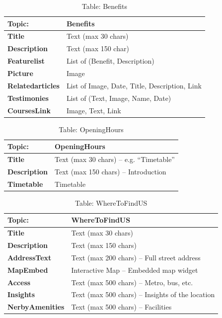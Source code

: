 \begin{table}[H]
\centering
\begin{tabularx}{\textwidth}{|>{\bfseries}l|X|}
\hline
Topic: & \textbf{Benefits} \\
\hline
Title & Text (max 30 chars) \\
\hline
Description & Text (max 150 char) \\
\hline
Featurelist & List of (Benefit, Description) \\
\hline
Picture & Image \\
\hline
Relatedarticles & List of {Image, Date, Title, Description, Link} \\
\hline
Testimonies & List of (Text, Image, Name, Date) \\
\hline
CoursesLink & Image, Text, Link \\
\hline
\end{tabularx}
\caption{Table: Benefits}
\end{table}

\begin{table}[H]
\centering
\begin{tabularx}{\textwidth}{|>{\bfseries}l|X|}
\hline
Topic: & \textbf{OpeningHours} \\
\hline
Title & Text (max 30 chars) – e.g. “Timetable” \\
\hline
Description & Text (max 150 chars) – Introduction \\
\hline
Timetable & Timetable \\
\hline
\end{tabularx}
\caption{Table: OpeningHours}
\end{table}

\begin{table}[H]
\centering
\begin{tabularx}{\textwidth}{|>{\bfseries}l|X|}
\hline
Topic: & \textbf{WhereToFindUS} \\
\hline
Title & Text (max 30 chars) \\
\hline
Description & Text (max 150 chars) \\
\hline
AddressText & Text (max 200 chars) – Full street address \\
\hline
MapEmbed & Interactive Map – Embedded map widget \\
\hline
Access & Text (max 500 chars) – Metro, bus, etc. \\
\hline
Insights & Text (max 500 chars) – Insights of the location \\
\hline
NerbyAmenities & Text (max 500 chars) – Facilities \\
\hline
\end{tabularx}
\caption{Table: WhereToFindUS}
\end{table}


